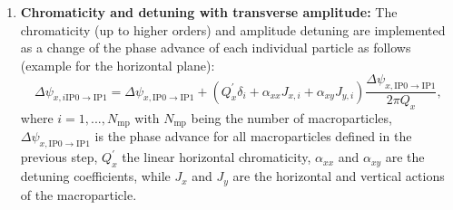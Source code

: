 {\begin{enumerate}
    It should be noted that if no detuning source is added (see next step) the matrix $M$ is the same for all particles.
    \item \textbf{Chromaticity and detuning with transverse amplitude:} The chromaticity (up to higher orders) and amplitude detuning are implemented as a change of the phase advance of each individual particle as follows (example for the horizontal plane):
    \begin{equation}\label{eq:change_phase_advance_detunign}
        \Delta \psi_{x, i \mathrm{IP0 \to IP1 }} = \Delta \psi_{x, \mathrm{IP0 \to IP1 }} + (Q^\prime_x \delta_i + \alpha_{xx}J_{x, i} + \alpha_{xy}J_{y,i}) \frac{\Delta \psi_{x, \mathrm{IP0 \to IP1 }}}{2\pi Q_x}, 
    \end{equation}
    where $i=1, ..., N_\mathrm{mp}$ with $N_\mathrm{mp}$ being the number of macroparticles, $\Delta \psi_{x, \mathrm{IP0 \to IP1 }}$ is the phase advance for all macroparticles defined in the previous step, $Q_x^\prime$ the linear horizontal chromaticity, $\alpha_{xx}$ and $\alpha_{xy}$ are the detuning coefficients, while $J_x$ and $J_y$ are the horizontal and vertical actions of the macroparticle. %


\end{enumerate}}
